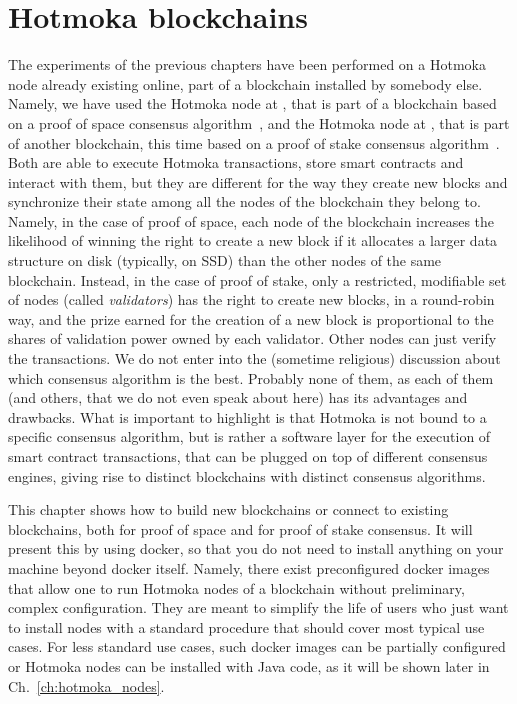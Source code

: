 \chapter{Hotmoka blockchains}\label{ch:hotmoka_blockchains}

The experiments of the previous chapters have been performed on a
Hotmoka node already existing online, part of a blockchain installed by somebody else.
Namely, we have used the Hotmoka node at \serverMokamint{}, that is part
of a blockchain based on a proof of space consensus algorithm~\cite{Spoto25},
and the Hotmoka node at \serverTendermint{}, that is part of
another blockchain, this time based on a proof of stake consensus algorithm~\cite{Kwon14}.
Both are able to execute Hotmoka transactions, store smart contracts and interact with them,
but they are different for the way they create new blocks and
synchronize their state among all the nodes
of the blockchain they belong to. Namely, in the case of proof of space, each node
of the blockchain increases the likelihood of winning the right to create a new block
if it allocates a larger data structure on disk (typically, on SSD) than the other nodes of the
same blockchain. Instead, in the case of proof of stake, only a restricted, modifiable set of nodes
(called \emph{validators}) has the right to create new blocks,
in a round-robin way, and the prize earned for the creation
of a new block is proportional to the shares of validation power
owned by each validator. Other nodes can just verify the transactions.
We do not enter into the (sometime religious) discussion about which consensus algorithm
is the best. Probably none of them, as each of them (and others, that we do not even speak about here)
has its advantages and drawbacks. What is important to highlight is that Hotmoka is not
bound to a specific consensus algorithm, but is rather a software layer for the execution
of smart contract transactions, that can be plugged on top of different consensus engines,
giving rise to distinct blockchains with distinct consensus algorithms.

This chapter shows how to build new blockchains or connect to existing blockchains,
both for proof of space and for proof of stake consensus. It will present this by using docker,
so that you do not need to install anything on your machine beyond docker itself.
Namely, there exist preconfigured docker images that allow one to run Hotmoka nodes of
a blockchain without preliminary, complex configuration. They are meant to simplify the
life of users who just want to install nodes with a standard procedure that should cover
most typical use cases. For less standard use cases, such docker images can be partially configured
or Hotmoka nodes can be installed with Java code, as it will be shown later in Ch.~\ref{ch:hotmoka_nodes}.


